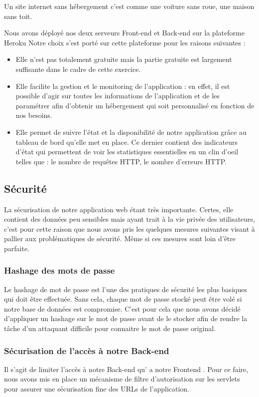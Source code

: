 \documentclass[12pt]{article}
\begin{document}
Un site internet sans hébergement c’est comme une voiture sans roue, une maison sans toit.

Nous avons déployé nos deux serveurs Front-end et Back-end sur la plateforme  Heroku
Notre choix s’est porté sur cette plateforme pour les raisons suivantes : 

\begin{itemize}
   \item Elle n'est pas totalement gratuite mais la partie gratuite est largement suffisante dans le cadre de cette exercice.
   \\
    \item Elle facilite la gestion et le monitoring de l’application : en effet, il est possible d’agir sur toutes les informations de l’application et de les paramétrer afin d’obtenir un hébergement qui soit personnalisé en fonction de nos besoins. 
    \\
    \item Elle permet de suivre l’état et la disponibilité de notre application grâce au tableau de bord qu’elle met en place. Ce dernier contient des indicateurs d’état qui permettent de voir les statistiques essentielles en un clin d’oeil telles que : le nombre de requêtes HTTP, le nombre d’erreurs HTTP.
\end{itemize}

\subsection{Sécurité}
La sécurisation de notre application web étant très importante. Certes, elle contient des
données peu sensibles mais ayant trait à la vie privée des utilisateurs, c’est
pour cette raison que nous avons pris les quelques mesures suivantes visant à pallier aux
problématiques de sécurité. Même si ces mesures sont loin d’être parfaite.

\subsubsection{Hashage des mots de passe}
Le hashage de mot de passe est l'une des pratiques de sécurité les plus basiques qui doit
être effectuée. Sans cela, chaque mot de passe stocké peut être volé si notre base de données
est compromise. C’est pour cela que nous avons décidé d’appliquer un hashage sur le mot de
passe avant de le stocker afin de rendre la tâche d'un attaquant difficile pour connaitre le mot
de passe original.
\subsubsection{Sécurisation de l'accès à notre Back-end}
Il s'agit de limiter l'accès à  notre Back-end qu' a notre Frontend .
 Pour ce faire, nous avons mis en place un mécanisme de filtre d’autorisation sur les servlets pour assurer une sécurisation fine des URLs de l’application. 
\end{document}
